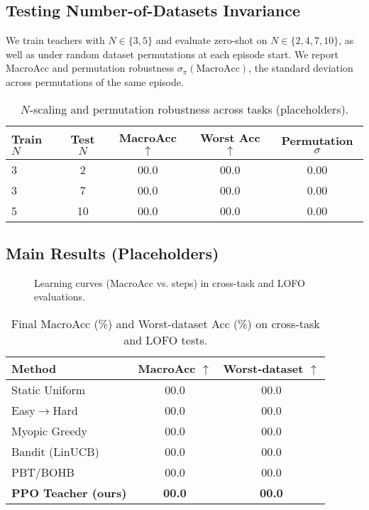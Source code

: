 \documentclass[11pt]{article}
\newcommand{\MacroAcc}{\mathrm{MacroAcc}}
\newcommand{\1}{\mathbf{1}}
\begin{document}
\subsection{Testing Number-of-Datasets Invariance}
We train teachers with $N\in\{3,5\}$ and evaluate zero-shot on $N\in\{2,4,7,10\}$, as well as under random dataset permutations at each episode start.
We report MacroAcc and permutation robustness $\sigma_\pi(\MacroAcc)$, the standard deviation across permutations of the same episode.
\begin{table}[H]
\centering
\caption{$N$-scaling and permutation robustness across tasks (placeholders).}
\label{tab:ninvariance}
\begin{tabular}{lcccc}
\toprule
Train $N$ & Test $N$ & MacroAcc $\uparrow$ & Worst Acc $\uparrow$ & Permutation $\sigma$ \\
\midrule
3 & 2 & 00.0 & 00.0 & 0.00 \\
3 & 7 & 00.0 & 00.0 & 0.00 \\
5 & 10 & 00.0 & 00.0 & 0.00 \\
\bottomrule
\end{tabular}
\end{table}

\subsection{Main Results (Placeholders)}
\begin{figure}[H]
  \centering
  \fbox{\rule{0pt}{2in}\rule{0.95\linewidth}{0pt}}
  \caption{Learning curves (MacroAcc vs. steps) in cross-task and LOFO evaluations.}
  \label{fig:indist}
\end{figure}

\begin{table}[H]
\centering
\caption{Final MacroAcc (\%) and Worst-dataset Acc (\%) on cross-task and LOFO tests.}
\label{tab:indist}
\begin{tabular}{lcc}
\toprule
Method & MacroAcc $\uparrow$ & Worst-dataset $\uparrow$ \\
\midrule
Static Uniform & 00.0 & 00.0 \\
Easy$\to$Hard & 00.0 & 00.0 \\
Myopic Greedy & 00.0 & 00.0 \\
Bandit (LinUCB) & 00.0 & 00.0 \\
PBT/BOHB & 00.0 & 00.0 \\
\textbf{PPO Teacher (ours)} & \textbf{00.0} & \textbf{00.0} \\
\bottomrule
\end{tabular}
\end{table}
\end{document}
